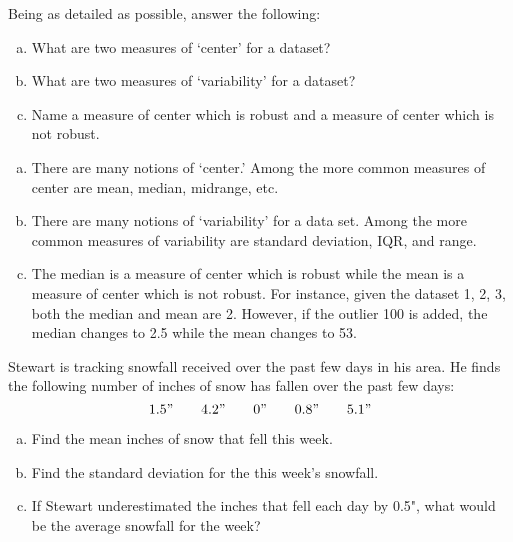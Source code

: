 \documentclass[11pt,letterpaper]{article}
\begin{document}

 Being as detailed as possible, answer the following:
	\begin{enumerate}[(a)]
	\item What are two measures of `center' for a dataset? 
	\item What are two measures of `variability' for a dataset?
	\item Name a measure of center which is robust and a measure of center which is not robust. 
	\end{enumerate} \pspace

\sol 
\begin{enumerate}[(a)]
\item There are many notions of `center.' Among the more common measures of center are mean, median, midrange, etc. \pspace

\item There are many notions of `variability' for a data set. Among the more common measures of variability are standard deviation, IQR, and range. \pspace

\item The median is a measure of center which is robust while the mean is a measure of center which is not robust. For instance, given the dataset 1, 2, 3, both the median and mean are 2. However, if the outlier 100 is added, the median changes to 2.5 while the mean changes to 53. 
\end{enumerate}



\newpage



 Stewart is tracking snowfall received over the past few days in his area. He finds the following number of inches of snow has fallen over the past few days:
	\[
	1.5" \qquad 4.2" \qquad 0" \qquad 0.8" \qquad 5.1"
	\]

\begin{enumerate}[(a)]
\item Find the mean inches of snow that fell this week.
\item Find the standard deviation for the this week's snowfall. 
\item If Stewart underestimated the inches that fell each day by 0.5", what would be the average snowfall for the week?
\end{enumerate} \pspace
\end{document}
